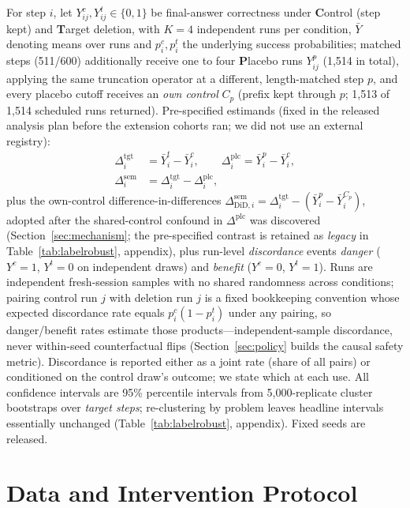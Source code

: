 \documentclass[11pt]{article}
\begin{document}
For step $i$, let $Y^{c}_{ij}, Y^{t}_{ij} \in \{0,1\}$ be final-answer correctness under \textbf{C}ontrol (step kept) and \textbf{T}arget deletion, with $K{=}4$ independent runs per condition, $\bar{Y}$ denoting means over runs and $p^{c}_i, p^{t}_i$ the underlying success probabilities; matched steps (511/600) additionally receive one to four \textbf{P}lacebo runs $Y^{p}_{ij}$ (1{,}514 in total), applying the same truncation operator at a different, length-matched step $p$, and every placebo cutoff receives an \emph{own control} $C_p$ (prefix kept through $p$; 1{,}513 of 1{,}514 scheduled runs returned). Pre-specified estimands (fixed in the released analysis plan before the extension cohorts ran; we did not use an external registry):
\begin{align}
\Delta^{\mathrm{tgt}}_i &= \bar{Y}^{t}_{i} - \bar{Y}^{c}_{i}, \qquad
\Delta^{\mathrm{plc}}_i = \bar{Y}^{p}_{i} - \bar{Y}^{c}_{i}, \nonumber\\
\Delta^{\mathrm{sem}}_i &= \Delta^{\mathrm{tgt}}_i - \Delta^{\mathrm{plc}}_i,
\label{eq:estimands}
\end{align}
plus the own-control difference-in-differences $\Delta^{\mathrm{sem}}_{\mathrm{DiD},i} = \Delta^{\mathrm{tgt}}_i - (\bar{Y}^{p}_i - \bar{Y}^{C_p}_i)$, adopted after the shared-control confound in $\Delta^{\mathrm{plc}}$ was discovered (Section~\ref{sec:mechanism}; the pre-specified contrast is retained as \emph{legacy} in Table~\ref{tab:labelrobust}, appendix), plus run-level \emph{discordance} events \emph{danger} ($Y^{c}{=}1$, $Y^{t}{=}0$ on independent draws) and \emph{benefit} ($Y^{c}{=}0$, $Y^{t}{=}1$). Runs are independent fresh-session samples with no shared randomness across conditions; pairing control run $j$ with deletion run $j$ is a fixed bookkeeping convention whose expected discordance rate equals $p^{c}_i(1-p^{t}_i)$ under any pairing, so danger/benefit rates estimate those products---independent-sample discordance, never within-seed counterfactual flips (Section~\ref{sec:policy} builds the causal safety metric). Discordance is reported either as a joint rate (share of all pairs) or conditioned on the control draw's outcome; we state which at each use. All confidence intervals are 95\% percentile intervals from 5{,}000-replicate cluster bootstraps over \emph{target steps}; re-clustering by problem leaves headline intervals essentially unchanged (Table~\ref{tab:labelrobust}, appendix). Fixed seeds are released.

\section{Data and Intervention Protocol}
\label{sec:protocol}
\end{document}
